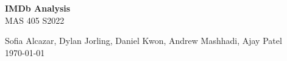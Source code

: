 \documentclass[10pt]{article}
\begin{document}

\newif\ifuselocaldir
\uselocaldirtrue
\uselocaldirfalse

\newcommand{\DXZ}{
\begin{flushright}
\vspace{-.4in}
 { \raisebox{0.30ex}{{\tiny D}}\hspace{0.008in}X\hspace{0.01in}\raisebox{0.30ex}{{\tiny Z}}     }
\end{flushright}
}

\newenvironment{myQuote}[2]%
               {\begin{list}{}{\leftmargin#1\rightmargin#2}\item{}}%
               {\end{list}}

\begin{myQuote}{4cm}{4cm}
\begin{center}
{\huge
\textbf{IMDb Analysis} \\[0.4cm]
}
{\Large
MAS 405 S2022
}
\end{center}
\end{myQuote}


\begin{myQuote}{3cm}{3cm}
{\normalsize
\begin{center}
Sofia Alcazar, Dylan Jorling, Daniel Kwon, Andrew Mashhadi, Ajay Patel \\
\today
\end{center}
}
\end{myQuote}





%

\end{document}
